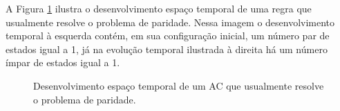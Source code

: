 \documentclass[12pt,a4paper]{article}
\begin{document}
A Figura \ref{fig:parity-rule} ilustra o desenvolvimento espaço temporal de uma regra que usualmente resolve o problema de paridade. Nessa imagem o desenvolvimento temporal à esquerda contém, em sua configuração inicial, um número par de estados igual a 1, já na evolução temporal ilustrada à direita há um número ímpar de estados igual a 1.
\begin{figure}[h!]
	\center
	\qquad
	\caption{Desenvolvimento espaço temporal de um AC que usualmente resolve o problema de paridade.}
	\label{fig:parity-rule}
\end{figure}
\end{document}
